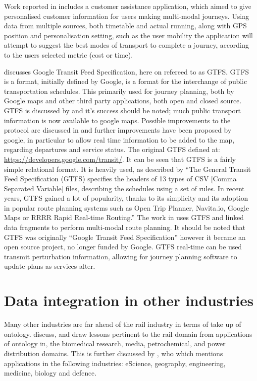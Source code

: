 Work reported in \citet{Verstichel2014} includes a customer assistance application, which aimed to give personalised customer information for users making multi-modal journeys. Using data from multiple sources, both timetable and actual running, along with GPS position and personalisation setting, such as the user mobility the application will attempt to suggest the best modes of transport to complete a journey, according to the users selected metric (cost or time). 

\citet{Morris2016} discusses Google Transit Feed Specification, here on refereed to as GTFS. GTFS is a format, initially defined by Google, is a format for the interchange of public transportation schedules. This primarily used for journey planning, both by Google maps and other third party applications, both open and closed source.  GTFS is discussed by \citet{Santos2014} and it's success should be noted; much public transport information is now available to google maps. Possible improvements to the protocol are discussed in \citet{Santos2014} and further improvements have been proposed by google, in particular to allow real time information to be added to the map, regarding departures and service status. The original GTFS defined at: \url{https://developers.google.com/transit/}. It can be seen that GTFS is a fairly simple relational format. It is heavily used, as described by \citet{Colpaert} ``The General Transit Feed Specification (GTFS) specifies the headers of 13 types of CSV [Comma Separated Variable] files, describing the schedules using a set of rules. In recent years, GTFS gained a lot of popularity, thanks to its simplicity and its adoption in popular route planning systems such as Open Trip Planner, Navita.io, Google Maps or RRRR Rapid Real-time Routing.'' The work in \citet{Colpaert} uses GTFS and linked data fragments to perform multi-modal route planning. It should be noted that GTFS was originally ``Google Transit Feed Specification'' however it became an open source project, no longer funded by Google. GTFS real-time can be used transmit perturbation information, allowing for journey planning software to update plans as services alter. 


\section{Data integration in other industries}
Many other industries are far ahead of the rail industry in terms of take up of ontology. \citet{Morris2014} discuss, and draw lessons pertinent to the rail domain from applications of ontology in, the biomedical research, media, petrochemical, and power distribution domains. This is further discussed by \citet{Horrocks2007}, who which mentions applications in the following industries: eScience, geography, engineering, medicine, biology and defence.

